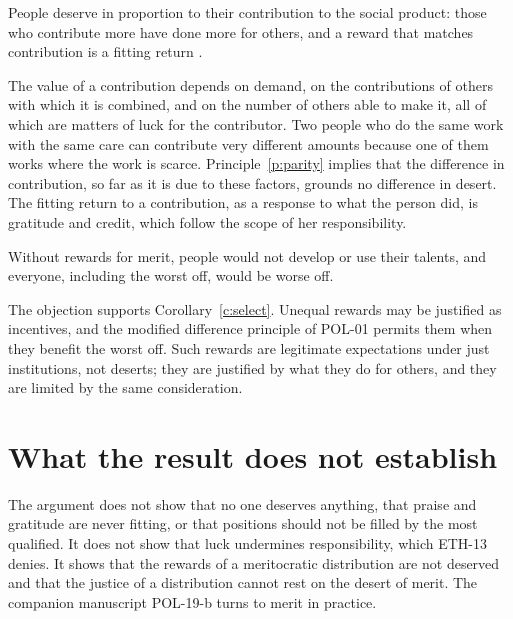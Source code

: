 \documentclass{situationist-preprint}
\begin{document}
\begin{objection}[Contribution]
People deserve in proportion to their contribution to the social product: those who contribute more have done more for others, and a reward that matches contribution is a fitting return \citep{Miller1999}.
\end{objection}

\begin{reply}
The value of a contribution depends on demand, on the contributions of others with which it is combined, and on the number of others able to make it, all of which are matters of luck for the contributor. Two people who do the same work with the same care can contribute very different amounts because one of them works where the work is scarce. Principle~\ref{p:parity} implies that the difference in contribution, so far as it is due to these factors, grounds no difference in desert. The fitting return to a contribution, as a response to what the person did, is gratitude and credit, which follow the scope of her responsibility.
\end{reply}

\begin{objection}[Incentives]
Without rewards for merit, people would not develop or use their talents, and everyone, including the worst off, would be worse off.
\end{objection}

\begin{reply}
The objection supports Corollary~\ref{c:select}. Unequal rewards may be justified as incentives, and the modified difference principle of POL-01 permits them when they benefit the worst off. Such rewards are legitimate expectations under just institutions, not deserts; they are justified by what they do for others, and they are limited by the same consideration.
\end{reply}

\section{What the result does not establish}

The argument does not show that no one deserves anything, that praise and gratitude are never fitting, or that positions should not be filled by the most qualified. It does not show that luck undermines responsibility, which ETH-13 denies. It shows that the rewards of a meritocratic distribution are not deserved and that the justice of a distribution cannot rest on the desert of merit. The companion manuscript POL-19-b turns to merit in practice.
\end{document}

